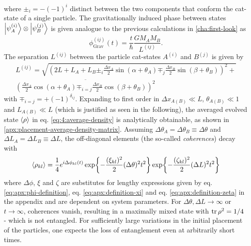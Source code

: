 where $\pm_i = -(-1)^{i}$ distinct between the two components that conform the cat-state of a single particle.
The gravitationally induced phase between states $\ket{\psi^{(i)}_A}\otimes\ket{\psi^{(j)}_B}$ is given analogue to the previous calculations in \cref{cha:first-look} as
\begin{equation}\label{eq:4:phi-grav}
  \phi^{(ij)}_\mathrm{Grav}(t) = \frac{t}{\hbar} \frac{G M_A M_B}{L^{(ij)}} .
\end{equation}
The separation $L^{(ij)}$ between the particle cat-states $A^{(i)}$ and $B^{(j)}$ is given by
\begin{multline}\label{eq:4:L-gravity}
  L^{(ij)} = \sqrt{\left(2L + L_A + L_B \pm_i \frac{\Delta x_A}{2}\sin(\alpha + \theta_A) \mp_j \frac{\Delta x_B}{2}\sin(\beta + \theta_B)\right)^2 +} \\ \overline{\left(\frac{\Delta x_A}{2}\cos(\alpha + \theta_A) \mp_{i=j} \frac{\Delta x_B}{2}\cos(\beta + \theta_B)\right)^2}
\end{multline}
with $\mp_{i=j} = +(-1)^{\delta_{ij}}$.
Expanding to first order in $\Delta x_{A(B)} \ll L$, $\theta_{A(B)} \ll 1$ and $L_{A(B)} \ll L$ (which is justified as seen in the following), the averaged evolved state 
$\left\langle\rho\right\rangle$ in eq. \eqref{eq:4:average-density} is analytically obtainable, as shown in \cref{apx:placement-average-density-matrix}.
Assuming $\Delta \theta_A = \Delta \theta_B \equiv \Delta\theta$ and $\Delta L_A = \Delta L_B \equiv \Delta L$, the off-diagonal elements (the so-called \textit{coherences}) decay with
\begin{equation}\label{eq:4:average-density-element}
  \left\langle\rho_{kl}\right\rangle = \frac{1}{4} e^{i \Delta \phi_{kl}(t)} \exp{-\frac{(\xi_{kl})^2}{2} (\Delta\theta)^2 t^2} \exp{-\frac{(\zeta_{kl})^2}{2} (\Delta L)^2 t^2}
\end{equation}
where $\Delta \phi$, $\xi$ and $\zeta$ are substitutes for lengthy expressions given by eq. \eqref{eq:apx:phi-definition}, eq. \eqref{eq:apx:definition-xi} and eq. \eqref{eq:apx:definition-zeta} in the appendix and are dependent on system parameters.
For $\Delta \theta, \Delta L \rightarrow \infty$ or $t\rightarrow \infty$, coherences vanish, resulting in a maximally mixed state with $\tr\rho^2 = 1/4$ - which is not entangled.
For sufficiently large variations in the initial placement of the particles, one expects the loss of entanglement even at arbitrarily short times.
